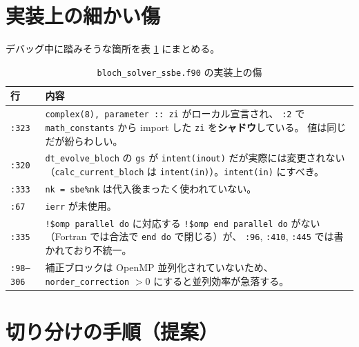 \documentclass[dvipdfmx,a4paper,11pt]{jsarticle}
\newcommand{\file}[1]{\texttt{#1}}
\begin{document}
\section{実装上の細かい傷}

デバッグ中に踏みそうな箇所を表 \ref{tab:smells} にまとめる。

\begin{table}[htbp]
\centering
\caption{\file{bloch\_solver\_ssbe.f90} の実装上の傷}
\label{tab:smells}
\begin{tabular}{@{}lp{110mm}@{}}
\toprule
\textbf{行} & \textbf{内容} \\
\midrule
\file{:323} &
\verb|complex(8), parameter :: zi| がローカル宣言され、
\file{:2} で \file{math\_constants} から import した \verb|zi| を\textbf{シャドウ}している。
値は同じだが紛らわしい。 \\[1mm]

\file{:320} &
\verb|dt_evolve_bloch| の \verb|gs| が \verb|intent(inout)| だが実際には変更されない
（\verb|calc_current_bloch| は \verb|intent(in)|）。\verb|intent(in)| にすべき。 \\[1mm]

\file{:333} &
\verb|nk = sbe%nk| は代入後まったく使われていない。 \\[1mm]

\file{:67} &
\verb|ierr| が未使用。 \\[1mm]

\file{:335} &
\verb|!$omp parallel do| に対応する \verb|!$omp end parallel do| がない
（Fortran では合法で \verb|end do| で閉じる）が、
\file{:96}, \file{:410}, \file{:445} では書かれており不統一。 \\[1mm]

\file{:98--306} &
補正ブロックは OpenMP 並列化されていないため、
\file{norder\_correction} $> 0$ にすると並列効率が急落する。 \\
\bottomrule
\end{tabular}
\end{table}

\section{切り分けの手順（提案）}
\end{document}
